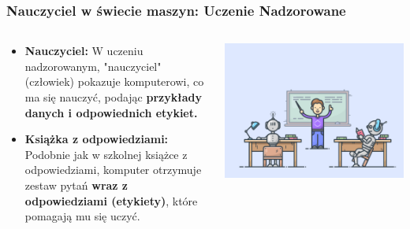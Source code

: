 \documentclass[smaller]{beamer}
\begin{document}

\begin{frame}
\frametitle{Nauczyciel w świecie maszyn: Uczenie Nadzorowane}

\begin{columns}
    \begin{column}{0.5\textwidth}
        \begin{itemize}
            \item \textbf{Nauczyciel:} W uczeniu nadzorowanym, "nauczyciel" (człowiek) pokazuje komputerowi, co ma się nauczyć, podając \textbf{przykłady danych i odpowiednich etykiet.}
            \item \textbf{Książka z odpowiedziami:} Podobnie jak w szkolnej książce z odpowiedziami, komputer otrzymuje zestaw pytań \textbf{wraz z odpowiedziami (etykiety)}, które pomagają mu się uczyć.
        \end{itemize}
    \end{column}

    \begin{column}{0.5\textwidth}
        \centering
        \includegraphics[width=\linewidth]{../manifest/sl-intuition.png}
    \end{column}
\end{columns}

\end{frame}

\end{document}
